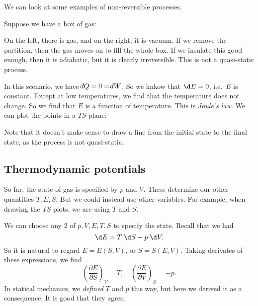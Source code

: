 \documentclass[a4paper]{article}
\def\di{{\mathchar'26\mkern-12mu d}}
\begin{document}
We can look at some examples of non-reversible processes.
\begin{eg}
  Suppose we have a box of gas:
  \begin{center}
  \end{center}
  On the left, there is gas, and on the right, it is vacuum. If we remove the partition, then the gas moves on to fill the whole box. If we insulate this good enough, then it is adiabatic, but it is clearly irreversible. This is not a quasi-static process.

  In this scenario, we have $\di Q = 0 = \di W$. So we knkow that $\d E = 0$, i.e.\ $E$ is constant. Except at low temperatures, we find that the temperature does not change. So we find that $E$ is a function of temperature. This is \emph{Joule's law}. We can plot the points in a $TS$ plane:
  \begin{center}
  \end{center}
  Note that it doesn't make sense to draw a line from the initial state to the final state, as the process is not quasi-static.
\end{eg}

\subsection{Thermodynamic potentials}
So far, the state of gas is specified by $p$ and $V$. These determine our other quantities $T, E, S$. But we could instead use other variables. For example, when drawing the $TS$ plots, we are using $T$ and $S$.

We can choose any $2$ of $p, V, E, T, S$ to specify the state. Recall that we had
\[
  \d E = T \;\d S - p \;\d V.
\]
So it is natural to regard $E = E(S, V)$, or $S = S(E, V)$. Taking derivates of these expressions, we find
\[
  \left(\frac{\partial E}{\partial S}\right)_V = T,\quad \left(\frac{\partial E}{\partial V}\right)_S = -p.
\]
In statical mechanics, we \emph{defined} $T$ and $p$ this way, but here we derived it as a consequence. It is good that they agree.
\end{document}
